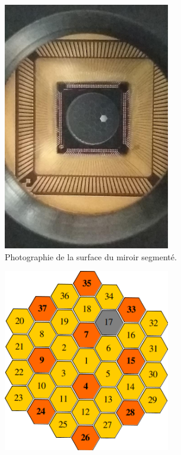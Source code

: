 \begin{figure}[ht!]
    \centering
    \begin{subfigure}[t]{0.4\textwidth}
        \centering
        \includegraphics[width=0.8\textwidth]{Figure_Chap2/20191114_BrokenSegment_02.jpg}
        \caption{Photographie de la surface du miroir segmenté.}
        \label{fig:IrisAOMapA}
    \end{subfigure}\hspace{0.01\textwidth}
    \begin{subfigure}[t]{0.5\textwidth}
        \centering
        \includegraphics[width=0.8\textwidth]{Figure_Chap2/MemsMap_AllFibers.png}

\end{subfigure}
\end{figure}
